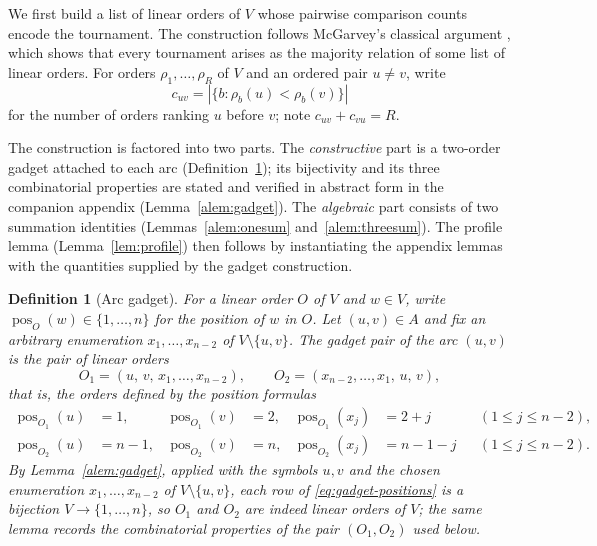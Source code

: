 \documentclass[11pt]{article}
\newtheorem{definition}{Definition}
\newcommand{\pos}{\operatorname{pos}}
\begin{document}
We first build a list of linear orders of $V$ whose pairwise comparison counts encode the tournament.  The construction follows McGarvey's classical argument \cite{McGarvey1953}, which shows that every tournament arises as the majority relation of some list of linear orders.  For orders $\rho_1,\ldots,\rho_R$ of $V$ and an ordered pair $u\ne v$, write
\begin{equation}
  c_{uv}=\left|\{b:\rho_b(u)<\rho_b(v)\}\right|
\end{equation}
for the number of orders ranking $u$ before $v$; note $c_{uv}+c_{vu}=R$.

The construction is factored into two parts.  The \emph{constructive} part is a two-order gadget attached to each arc (Definition~\ref{def:gadget}); its bijectivity and its three combinatorial properties are stated and verified in abstract form in the companion appendix (Lemma~\ref{alem:gadget}).  The \emph{algebraic} part consists of two summation identities (Lemmas~\ref{alem:onesum} and~\ref{alem:threesum}).  The profile lemma (Lemma~\ref{lem:profile}) then follows by instantiating the appendix lemmas with the quantities supplied by the gadget construction.

\begin{definition}[Arc gadget]\label{def:gadget}
For a linear order $O$ of $V$ and $w\in V$, write $\pos_O(w)\in\{1,\ldots,n\}$ for the position of $w$ in $O$.  Let $(u,v)\in A$ and fix an arbitrary enumeration $x_1,\ldots,x_{n-2}$ of $V\setminus\{u,v\}$.  The \emph{gadget pair} of the arc $(u,v)$ is the pair of linear orders
\begin{equation}
  O_1=(u,\,v,\,x_1,\ldots,x_{n-2}),\qquad
  O_2=(x_{n-2},\ldots,x_1,\,u,\,v),
\end{equation}
that is, the orders defined by the position formulas
\begin{equation}\label{eq:gadget-positions}
\begin{aligned}
  \pos_{O_1}(u)&=1, & \pos_{O_1}(v)&=2, & \pos_{O_1}(x_j)&=2+j &&(1\le j\le n-2),\\
  \pos_{O_2}(u)&=n-1, & \pos_{O_2}(v)&=n, & \pos_{O_2}(x_j)&=n-1-j &&(1\le j\le n-2).
\end{aligned}
\end{equation}
By Lemma~\ref{alem:gadget}, applied with the symbols $u,v$ and the chosen enumeration $x_1,\ldots,x_{n-2}$ of $V\setminus\{u,v\}$, each row of \eqref{eq:gadget-positions} is a bijection $V\to\{1,\ldots,n\}$, so $O_1$ and $O_2$ are indeed linear orders of $V$; the same lemma records the combinatorial properties of the pair $(O_1,O_2)$ used below.
\end{definition}
\end{document}
